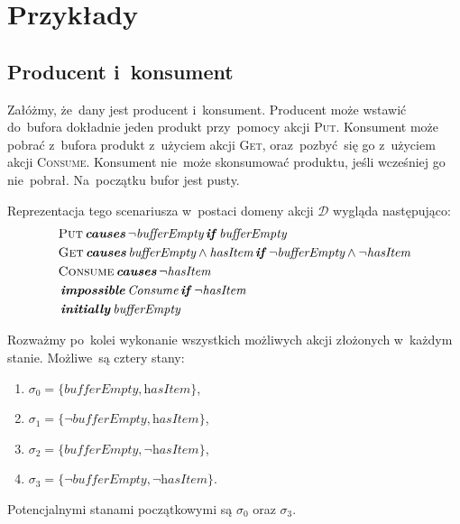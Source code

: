 \documentclass[11pt,a4paper]{article}
\DeclareMathOperator{\Initially}{\textbf{\textit{initially}}}
\DeclareMathOperator{\Causes}{\textbf{\textit{causes}}}
\DeclareMathOperator{\If}{\textbf{\textit{if}}}
\DeclareMathOperator{\Impossible}{\textbf{\textit{impossible}}}
\begin{document}
\section{Przykłady}

\subsection{Producent i~konsument}

Załóżmy, że~dany jest producent i~konsument.
Producent może wstawić do~bufora dokładnie jeden produkt przy~pomocy akcji \textsc{Put}.
Konsument może pobrać z~bufora produkt z~użyciem akcji \textsc{Get},
oraz~pozbyć~się go z~użyciem akcji \textsc{Consume}.
Konsument nie~może skonsumować produktu, jeśli wcześniej go nie~pobrał.
Na~początku bufor jest pusty.

Reprezentacja tego scenariusza w~postaci domeny akcji $\mathcal{D}$ wygląda następująco:
\begin{align*}
    & \textsc{Put} \Causes \neg \textit{bufferEmpty} \If \textit{bufferEmpty} \\
    & \textsc{Get} \Causes \textit{bufferEmpty} \land \textit{hasItem} \If \neg \textit{bufferEmpty} \land \neg \textit{hasItem} \\
    & \textsc{Consume} \Causes \neg \textit{hasItem} \\
    & \Impossible \textit{Consume} \If \neg \textit{hasItem} \\
    & \Initially \textit{bufferEmpty}
\end{align*}

Rozważmy po~kolei wykonanie wszystkich możliwych akcji złożonych w~każdym stanie. Możliwe~są cztery stany:

\begin{enumerate}
    \item $\sigma_0 = \{ \textit{bufferEmpty}, \textit{hasItem} \}$,
    \item $\sigma_1 = \{ \neg \textit{bufferEmpty}, \textit{hasItem} \}$,
    \item $\sigma_2 = \{ \textit{bufferEmpty}, \neg \textit{hasItem} \}$,
    \item $\sigma_3 = \{ \neg \textit{bufferEmpty}, \neg \textit{hasItem} \}$.
\end{enumerate}

Potencjalnymi stanami początkowymi są $\sigma_0$ oraz $\sigma_3$.
\end{document}
